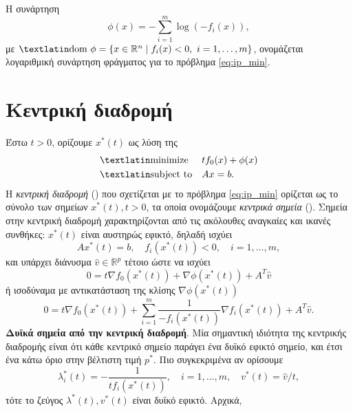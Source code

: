 Η συνάρτηση
\begin{equation*}
    \phi(x) = - \sum_{i=1}^m \log{(-f_i(x))},
\end{equation*}
με \( \text{\tl{dom}}\ \phi = \{ x \in \mathbb{R}^n \mid f_i (x) < 0,\ i= 1,
\dots, m \} \), ονομάζεται λογαριθμική συνάρτηση φράγματος για το πρόβλημα
\eqref{eq:ip_min}.

\section{Κεντρική διαδρομή}
Έστω \( t > 0 \), ορίζουμε \( x^*(t) \) ως λύση της
\begin{equation*}
    \begin{aligned}
        & \text{\tl{minimize}}
        & & tf_0(x) + \phi(x) \\
        & \text{\tl{subject to}}
        & & Ax = b.
    \end{aligned}
\end{equation*}
Η \emph{κεντρική διαδρομή} () που σχετίζεται με το πρόβλημα
\eqref{eq:ip_min} ορίζεται ως το σύνολο των σημείων \( x^*(t), t > 0 \), τα
οποία ονομάζουμε \emph{κεντρικά σημεία} (). Σημεία στην
κεντρική διαδρομή χαρακτηρίζονται από τις ακόλουθες αναγκαίες και ικανές
συνθήκες: \( x^*(t) \) είναι αυστηρώς εφικτό, δηλαδή ισχύει
\begin{equation*}
    Ax^*(t) = b, \quad f_i(x^*(t)) < 0, \quad i = 1,\dots, m,
\end{equation*}
και υπάρχει διάνυσμα \( \hat{v} \in \mathbb{R}^p \) τέτοιο ώστε
να ισχύει
\begin{equation*}
    0 = t\nabla f_0 (x^*(t)) + \nabla \phi (x^*(t)) + A^T \hat{v}
\end{equation*}
ή ισοδύναμα με αντικατάσταση της κλίσης \( \nabla \phi (x^*(t)) \)
\begin{equation}\label{eq:ip_cpc}
    0 = t\nabla f_0 (x^*(t)) + \sum_{i = 1}^m \dfrac{1}{-f_i(x^*(t))} \nabla f_i
    (x^*(t)) + A^T \hat{v}.
\end{equation}
\textbf{Δυϊκά σημεία από την κεντρική διαδρομή}. Μία σημαντική ιδιότητα της
κεντρικής διαδρομής είναι ότι κάθε κεντρικό σημείο
παράγει ένα δυϊκό εφικτό σημείο, και έτσι ένα κάτω όριο στην βέλτιστη τιμή
\( p^* \). Πιο συγκεκριμένα αν ορίσουμε
\begin{equation}\label{eq:ip_dual_feas}
    \lambda_i^*(t) = - \dfrac{1}{t f_i(x^*(t))},\quad i = 1, \dots, m,
    \quad v^*(t) = \hat{v}/t,
\end{equation}
τότε το ζεύγος \( \lambda^*(t), v^*(t) \) είναι δυϊκό εφικτό. Αρχικά,
